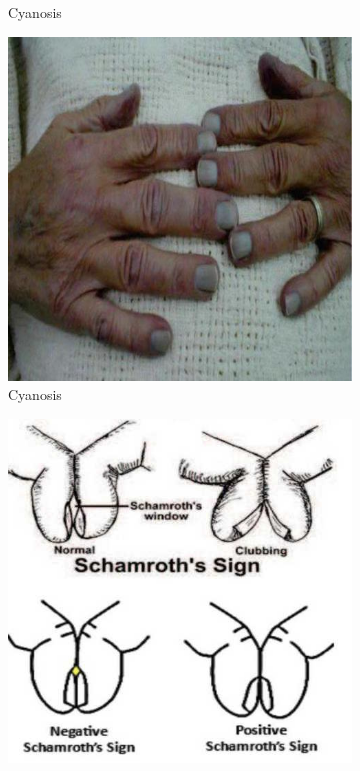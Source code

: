 \documentclass[a4paper,12pt]{book}
\begin{document}
{\begin{figure}[h]
\begin{subfigure}[t]{.23\textwidth}
																	\caption{Cyanosis}
																	\label{Cyanosis3}
																\end{subfigure}
																\hspace{\fill}
																\begin{subfigure}[t]{.23\textwidth}
																	\centering
																	\includegraphics[width=\textwidth]{./clinicalPhysioPic/cyanosis4-3.jpg}
																	\caption{Cyanosis}
																	\label{Cyanosis4}
																\end{subfigure}
																\hspace{\fill}
																\begin{subfigure}[t]{.23\textwidth}
																	\centering
																	\includegraphics[width=\textwidth]{./clinicalPhysioPic/clubbing3-0.jpg}

\end{subfigure}
\end{figure}}
\end{document}
